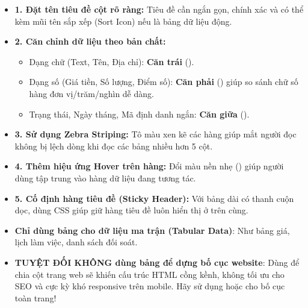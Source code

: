 \begin{tipBox}
\begin{itemize}[leftmargin=1.5em, itemsep=3pt, parsep=0pt]
    \item \textbf{1. Đặt tên tiêu đề cột rõ ràng:} Tiêu đề  cần ngắn gọn, chính xác và có thể kèm mũi tên sắp xếp (Sort Icon) nếu là bảng dữ liệu động.
    \item \textbf{2. Căn chỉnh dữ liệu theo bản chất:}
        \begin{itemize}
            \item Dạng chữ (Text, Tên, Địa chỉ): \textbf{Căn trái} ().
            \item Dạng số (Giá tiền, Số lượng, Điểm số): \textbf{Căn phải} () giúp so sánh chữ số hàng đơn vị/trăm/nghìn dễ dàng.
            \item Trạng thái, Ngày tháng, Mã định danh ngắn: \textbf{Căn giữa} ().
        \end{itemize}
    \item \textbf{3. Sử dụng Zebra Striping:} Tô màu xen kẽ các hàng giúp mắt người đọc không bị lệch dòng khi đọc các bảng nhiều hơn 5 cột.
    \item \textbf{4. Thêm hiệu ứng Hover trên hàng:} Đổi màu nền nhẹ () giúp người dùng tập trung vào hàng dữ liệu đang tương tác.
    \item \textbf{5. Cố định hàng tiêu đề (Sticky Header):} Với bảng dài có thanh cuộn dọc, dùng CSS  giúp giữ hàng tiêu đề luôn hiển thị ở trên cùng.
\end{itemize}
\end{tipBox}

\begin{warnBox}
\begin{itemize}[leftmargin=1.5em, itemsep=2pt, parsep=0pt]
    \item \textbf{Chỉ dùng bảng cho dữ liệu ma trận (Tabular Data)}: Như bảng giá, lịch làm việc, danh sách đối soát.
    \item \textbf{TUYỆT ĐỐI KHÔNG dùng bảng để dựng bố cục website}: Dùng  để chia cột trang web sẽ khiến cấu trúc HTML cồng kềnh, không tối ưu cho SEO và cực kỳ khó responsive trên mobile. Hãy sử dụng  hoặc  cho bố cục toàn trang!
\end{itemize}
\end{warnBox}

